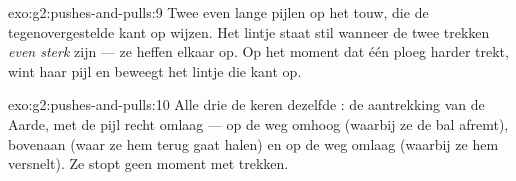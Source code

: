 \begin{solution}{exo:g2:pushes-and-pulls:9}
Twee even lange pijlen op het touw, die de tegenovergestelde kant op
wijzen. Het lintje staat stil wanneer de twee trekken \emph{even
sterk} zijn --- ze heffen elkaar op. Op het moment dat één ploeg
harder trekt, wint haar pijl en beweegt het lintje die kant op.
\end{solution}

\begin{solution}{exo:g2:pushes-and-pulls:10}
Alle drie de keren dezelfde : de aantrekking van de Aarde, met de
pijl recht omlaag --- op de weg omhoog (waarbij ze de bal afremt),
bovenaan (waar ze hem terug gaat halen) en op de weg omlaag (waarbij
ze hem versnelt). Ze stopt geen moment met trekken.
\end{solution}
